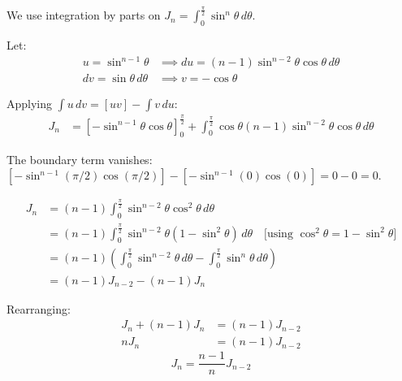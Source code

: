 \begin{solution}[Part (i)]
We use integration by parts on $J_n = \int_{0}^{\frac{\pi}{2}} \sin^n \theta \, d\theta$.

Let:
\begin{align*}
u = \sin^{n-1}\theta &\implies du = (n-1)\sin^{n-2}\theta \cos\theta \, d\theta \\
dv = \sin\theta \, d\theta &\implies v = -\cos\theta
\end{align*}

Applying $\int u \, dv = [uv] - \int v \, du$:
\begin{align*}
J_n &= \left[ -\sin^{n-1}\theta \cos\theta \right]_{0}^{\frac{\pi}{2}} + \int_{0}^{\frac{\pi}{2}} \cos\theta (n-1)\sin^{n-2}\theta \cos\theta \, d\theta
\end{align*}

The boundary term vanishes: $[-\sin^{n-1}(\pi/2)\cos(\pi/2)] - [-\sin^{n-1}(0)\cos(0)] = 0 - 0 = 0$.

\begin{align*}
J_n &= (n-1) \int_{0}^{\frac{\pi}{2}} \sin^{n-2}\theta \cos^2\theta \, d\theta \\
&= (n-1) \int_{0}^{\frac{\pi}{2}} \sin^{n-2}\theta (1 - \sin^2\theta) \, d\theta \quad \text{[using } \cos^2\theta = 1-\sin^2\theta\text{]} \\
&= (n-1) \left( \int_{0}^{\frac{\pi}{2}} \sin^{n-2}\theta \, d\theta - \int_{0}^{\frac{\pi}{2}} \sin^{n}\theta \, d\theta \right) \\
&= (n-1) J_{n-2} - (n-1) J_n
\end{align*}

Rearranging:
\begin{align*}
J_n + (n-1)J_n &= (n-1)J_{n-2} \\
n J_n &= (n-1)J_{n-2}
\end{align*}
\[
\boxed{J_n = \frac{n-1}{n} J_{n-2}}
\]
\end{solution}

